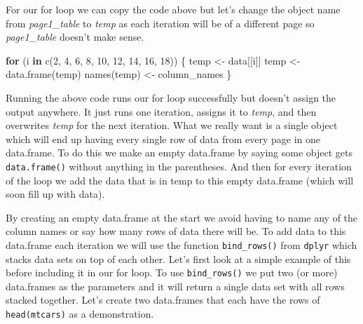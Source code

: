 \documentclass[
]{krantz}
\makeatletter
\newenvironment{Shaded}{\begin{snugshade}}{\end{snugshade}}
\newcommand{\ControlFlowTok}[1]{\textcolor[rgb]{0.27,0.27,0.27}{\textbf{#1}}}
\newcommand{\DecValTok}[1]{\textcolor[rgb]{0.06,0.06,0.06}{#1}}
\newcommand{\FunctionTok}[1]{\textcolor[rgb]{0,0,0}{#1}}
\newcommand{\NormalTok}[1]{#1}
\newcommand{\OtherTok}[1]{\textcolor[rgb]{0.37,0.37,0.37}{#1}}
\newenvironment{kframe}{%
\medskip{}
\setlength{\fboxsep}{.8em}
 \def\at@end@of@kframe{}%
 \ifinner\ifhmode%
  \def\at@end@of@kframe{\end{minipage}}%
  \begin{minipage}{\columnwidth}%
 \fi\fi%
 \def\FrameCommand##1{\hskip\@totalleftmargin \hskip-\fboxsep
 \colorbox{shadecolor}{##1}\hskip-\fboxsep
     \hskip-\linewidth \hskip-\@totalleftmargin \hskip\columnwidth}%
 \MakeFramed {\advance\hsize-\width
   \@totalleftmargin\z@ \linewidth\hsize
   \@setminipage}}%
 {\par\unskip\endMakeFramed%
 \at@end@of@kframe}
\renewenvironment{Shaded}{\begin{kframe}}{\end{kframe}}
\makeatother
\begin{document}
For our for loop we can copy the code above but let's change
the object name from \emph{page1\_table} to \emph{temp} as
each iteration will be of a different page so
\emph{page1\_table} doesn't make sense.

\begin{Shaded}
\begin{Highlighting}[]
\ControlFlowTok{for}\NormalTok{ (i }\ControlFlowTok{in} \FunctionTok{c}\NormalTok{(}\DecValTok{2}\NormalTok{, }\DecValTok{4}\NormalTok{, }\DecValTok{6}\NormalTok{, }\DecValTok{8}\NormalTok{, }\DecValTok{10}\NormalTok{, }\DecValTok{12}\NormalTok{, }\DecValTok{14}\NormalTok{, }\DecValTok{16}\NormalTok{, }\DecValTok{18}\NormalTok{)) \{}
\NormalTok{  temp }\OtherTok{\textless{}{-}}\NormalTok{ data[[i]]}
\NormalTok{  temp }\OtherTok{\textless{}{-}} \FunctionTok{data.frame}\NormalTok{(temp)}
  \FunctionTok{names}\NormalTok{(temp) }\OtherTok{\textless{}{-}}\NormalTok{ column\_names}
\NormalTok{\}}
\end{Highlighting}
\end{Shaded}

Running the above code runs our for loop successfully but
doesn't assign the output anywhere. It just runs one
iteration, assigns it to \emph{temp}, and then overwrites
\emph{temp} for the next iteration. What we really want is a
single object which will end up having every single row of
data from every page in one data.frame. To do this we make
an empty data.frame by saying some object gets
\texttt{data.frame()} without anything in the parentheses.
And then for every iteration of the loop we add the data
that is in temp to this empty data.frame (which will soon
fill up with data).

By creating an empty data.frame at the start we avoid having
to name any of the column names or say how many rows of data
there will be. To add data to this data.frame each iteration
we will use the function \texttt{bind\_rows()} from
\texttt{dplyr} which stacks data sets on top of each other.
Let's first look at a simple example of this before
including it in our for loop. To use \texttt{bind\_rows()}
we put two (or more) data.frames as the parameters and it
will return a single data set with all rows stacked
together. Let's create two data.frames that each have the
rows of \texttt{head(mtcars)} as a demonstration.
\end{document}
